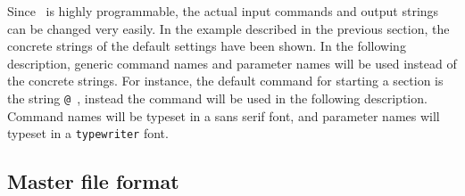 Since \mweb\ is highly programmable, the actual input commands and
output strings can be changed very easily. In the example described in
the previous section, the concrete strings of the default settings
have been shown. In the following
description, generic command names and parameter names will be used
instead of the concrete strings. For instance, the default command for
starting a section is the string \verb*|@ |, instead the command
 will be used in the following description.
Command names will be typeset in a {\sf sans serif} font, and
parameter names will typeset in a {\tt typewriter} font.

\subsection{Master file format}


